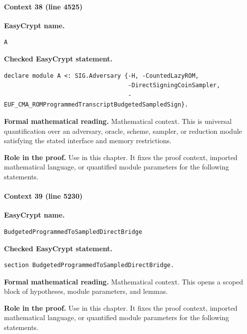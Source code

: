 \paragraph{Context 38 (line 4525)}
\noindent\textbf{EasyCrypt name.}
\begin{lstlisting}[language=EasyCrypt,basicstyle=\ttfamily\scriptsize]
A
\end{lstlisting}
\noindent\textbf{Checked EasyCrypt statement.}
\begin{lstlisting}[language=EasyCrypt,basicstyle=\ttfamily\scriptsize]
declare module A <: SIG.Adversary {-H, -CountedLazyROM,
                                   -DirectSigningCoinSampler,
                                   -EUF_CMA_ROMProgrammedTranscriptBudgetedSampledSign}.
\end{lstlisting}
\noindent\textbf{Formal mathematical reading.}
Mathematical context. This is universal quantification over an adversary, oracle, scheme, sampler, or reduction module satisfying the stated interface and memory restrictions.

\noindent\textbf{Role in the proof.}
Use in this chapter. It fixes the proof context, imported mathematical language, or quantified module parameters for the following statements.

\paragraph{Context 39 (line 5230)}
\noindent\textbf{EasyCrypt name.}
\begin{lstlisting}[language=EasyCrypt,basicstyle=\ttfamily\scriptsize]
BudgetedProgrammedToSampledDirectBridge
\end{lstlisting}
\noindent\textbf{Checked EasyCrypt statement.}
\begin{lstlisting}[language=EasyCrypt,basicstyle=\ttfamily\scriptsize]
section BudgetedProgrammedToSampledDirectBridge.
\end{lstlisting}
\noindent\textbf{Formal mathematical reading.}
Mathematical context. This opens a scoped block of hypotheses, module parameters, and lemmas.

\noindent\textbf{Role in the proof.}
Use in this chapter. It fixes the proof context, imported mathematical language, or quantified module parameters for the following statements.

